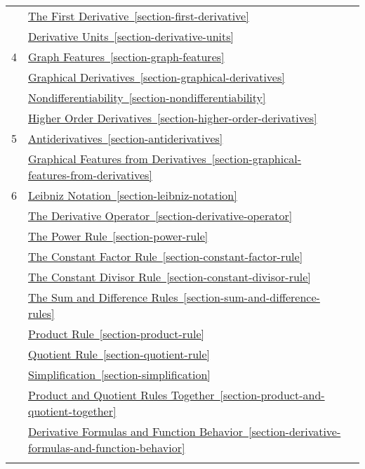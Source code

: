 \documentclass[12pt,]{book}
\theoremstyle{plain}
\theoremstyle{definition}
\numberwithin{equation}{section}
\newcommand{\hrulemedium}{\noalign{\hrule height 0.07em}}
\begin{document}
\begin{longtable}{clc}
&\hyperref[section-first-derivative]{The First Derivative~\ref*{section-first-derivative}}&\\
&\hyperref[section-derivative-units]{Derivative Units~\ref*{section-derivative-units}}&\\\hrulemedium
4&\hyperref[section-graph-features]{Graph Features~\ref*{section-graph-features}}&\\
&\hyperref[section-graphical-derivatives]{Graphical Derivatives~\ref*{section-graphical-derivatives}}&\\
&\hyperref[section-nondifferentiability]{Nondifferentiability~\ref*{section-nondifferentiability}}&\\
&\hyperref[section-higher-order-derivatives]{Higher Order Derivatives~\ref*{section-higher-order-derivatives}}&\\\hrulemedium
5&\hyperref[section-antiderivatives]{Antiderivatives~\ref*{section-antiderivatives}}&\\
&\hyperref[section-graphical-features-from-derivatives]{Graphical Features from Derivatives~\ref*{section-graphical-features-from-derivatives}}&\\\hrulemedium
6&\hyperref[section-leibniz-notation]{Leibniz Notation~\ref*{section-leibniz-notation}}&\\
&\hyperref[section-derivative-operator]{The Derivative Operator~\ref*{section-derivative-operator}}&\\
&\hyperref[section-power-rule]{The Power Rule~\ref*{section-power-rule}}&\\
&\hyperref[section-constant-factor-rule]{The Constant Factor Rule~\ref*{section-constant-factor-rule}}&\\
&\hyperref[section-constant-divisor-rule]{The Constant Divisor Rule~\ref*{section-constant-divisor-rule}}&\\
&\hyperref[section-sum-and-difference-rules]{The Sum and Difference Rules~\ref*{section-sum-and-difference-rules}}&\\
&\hyperref[section-product-rule]{Product Rule~\ref*{section-product-rule}}&\\
&\hyperref[section-quotient-rule]{Quotient Rule~\ref*{section-quotient-rule}}&\\
&\hyperref[section-simplification]{Simplification~\ref*{section-simplification}}&\\
&\hyperref[section-product-and-quotient-together]{Product and Quotient Rules Together~\ref*{section-product-and-quotient-together}}&\\
&\hyperref[section-derivative-formulas-and-function-behavior]{Derivative Formulas and Function Behavior~\ref*{section-derivative-formulas-and-function-behavior}}&\\\hrulemedium

\end{longtable}
\end{document}
